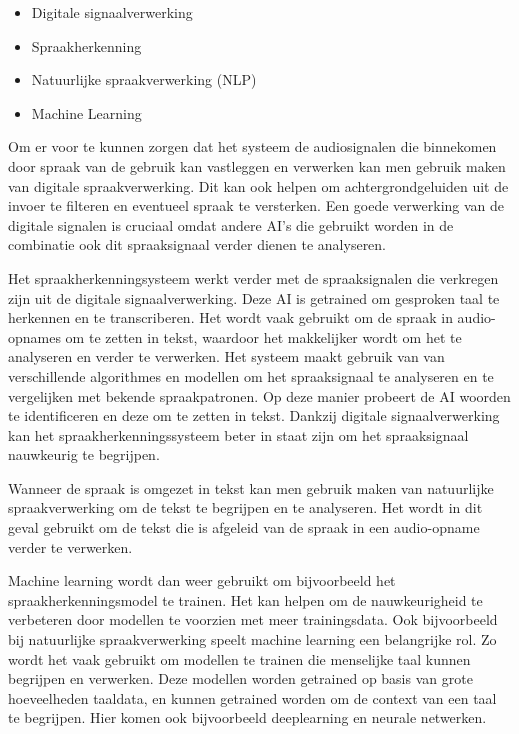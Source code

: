 \begin{itemize}
    \item Digitale signaalverwerking
    \item Spraakherkenning
    \item Natuurlijke spraakverwerking (NLP)
    \item Machine Learning
\end{itemize}

Om er voor te kunnen zorgen dat het systeem de audiosignalen die binnekomen door spraak van de gebruik kan vastleggen en verwerken kan men gebruik maken van digitale spraakverwerking. Dit kan ook helpen om achtergrondgeluiden uit de invoer te filteren en eventueel spraak te versterken. Een goede verwerking van de digitale signalen is cruciaal omdat andere AI's die gebruikt worden in de combinatie ook dit spraaksignaal verder dienen te analyseren.

Het spraakherkenningsysteem werkt verder met de spraaksignalen die verkregen zijn uit de digitale signaalverwerking. Deze AI is getrained om gesproken taal te herkennen en te transcriberen. Het wordt vaak gebruikt om de spraak in audio-opnames om te zetten in tekst, waardoor het makkelijker wordt om het te analyseren en verder te verwerken. Het systeem maakt gebruik van van verschillende algorithmes en modellen om het spraaksignaal te analyseren en te vergelijken met bekende spraakpatronen. Op deze manier probeert de AI woorden te identificeren en deze om te zetten in tekst. Dankzij digitale signaalverwerking kan het spraakherkenningssysteem beter in staat zijn om het spraaksignaal nauwkeurig te begrijpen.

Wanneer de spraak is omgezet in tekst kan men gebruik maken van natuurlijke spraakverwerking om de tekst te begrijpen en te analyseren. Het wordt in dit geval gebruikt om de tekst die is afgeleid van de spraak in een audio-opname verder te verwerken.

Machine learning wordt dan weer gebruikt om bijvoorbeeld het spraakherkenningsmodel te trainen. Het kan helpen om de nauwkeurigheid te verbeteren door modellen te voorzien met meer trainingsdata. Ook bijvoorbeeld bij natuurlijke spraakverwerking speelt machine learning een belangrijke rol. Zo wordt het vaak gebruikt om modellen te trainen die menselijke taal kunnen begrijpen en verwerken. Deze modellen worden getrained op basis van grote hoeveelheden taaldata, en kunnen getrained worden om de context van een taal te begrijpen. Hier komen ook bijvoorbeeld deeplearning en neurale netwerken.

